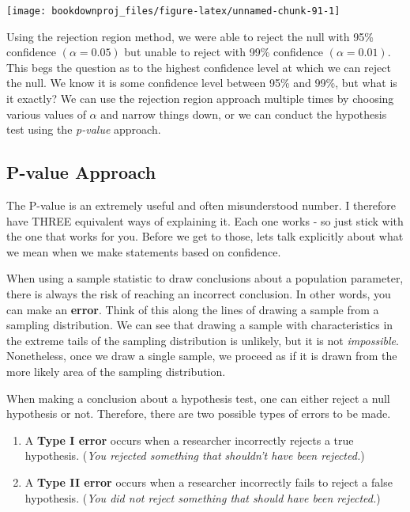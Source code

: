 \documentclass[
]{book}
\begin{document}
\begin{center}\texttt{[image: bookdownproj\_files/figure-latex/unnamed-chunk-91-1]} \end{center}

Using the rejection region method, we were able to reject the null with 95\% confidence \((\alpha=0.05)\) but unable to reject with 99\% confidence \((\alpha=0.01)\). This begs the question as to the highest confidence level at which we can reject the null. We know it is some confidence level between 95\% and 99\%, but what is it exactly? We can use the rejection region approach multiple times by choosing various values of \(\alpha\) and narrow things down, or we can conduct the hypothesis test using the \emph{p-value} approach.

\subsection{P-value Approach}\label{p-value-approach}

The P-value is an extremely useful and often misunderstood number. I therefore have THREE equivalent ways of explaining it. Each one works - so just stick with the one that works for you. Before we get to those, lets talk explicitly about what we mean when we make statements based on confidence.

When using a sample statistic to draw conclusions about a population parameter, there is always the risk of reaching an incorrect conclusion. In other words, you can make an \textbf{error}. Think of this along the lines of drawing a sample from a sampling distribution. We can see that drawing a sample with characteristics in the extreme tails of the sampling distribution is unlikely, but it is not \emph{impossible}. Nonetheless, once we draw a single sample, we proceed as if it is drawn from the more likely area of the sampling distribution.

When making a conclusion about a hypothesis test, one can either reject a null hypothesis or not. Therefore, there are two possible types of errors to be made.

\begin{enumerate}
\def\labelenumi{\arabic{enumi}.}
\item
  A \textbf{Type I error} occurs when a researcher incorrectly rejects a true hypothesis. (\emph{You rejected something that shouldn't have been rejected.})
\item
  A \textbf{Type II error} occurs when a researcher incorrectly fails to reject a false hypothesis. (\emph{You did not reject something that should have been rejected.})
\end{enumerate}
\end{document}
